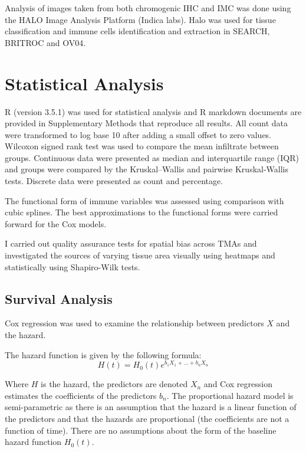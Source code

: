Analysis of images taken from both chromogenic IHC and IMC was done using the HALO Image Analysis Platform (Indica labs). Halo was used for tissue classification and immune cells identification and extraction in SEARCH, BRITROC and OV04. 

\section{Statistical Analysis}  %
\label{section1.4}

R (version 3.5.1) was used for statistical analysis and R markdown documents are provided in Supplementary Methods that reproduce all results. All count data were transformed to log base 10 after adding a small offset to zero values. Wilcoxon signed rank test was used to compare the mean infiltrate between groups. Continuous data were presented as median and interquartile range (IQR) and groups were compared by the Kruskal–Wallis and pairwise Kruskal-Wallis tests. Discrete data were presented as count and percentage.  

The functional form of immune variables was assessed using comparison with cubic splines. The best approximations to the functional forms were carried forward for the Cox models. 

I carried out quality assurance tests for spatial bias across TMAs and investigated the sources of varying tissue area visually using heatmaps and statistically using Shapiro-Wilk tests.


\subsection{Survival Analysis}

Cox regression was used to examine the relationship between predictors $X$ and the hazard.

The hazard function is given by the following formula:
\begin{equation}H(t) = H_0(t) e^ {b_1 X_1 + ... + b_n X_n} \end{equation} 

Where $H$ is the hazard, the predictors are denoted $X_n$ and Cox regression estimates the coefficients of the predictors $b_n$. The proportional hazard model is semi-parametric as there is an assumption that the hazard is a linear function of the predictors and that the hazards are proportional (the coefficients are not a function of time). There are no assumptions about the form of the baseline hazard function $H_0(t)$. 


